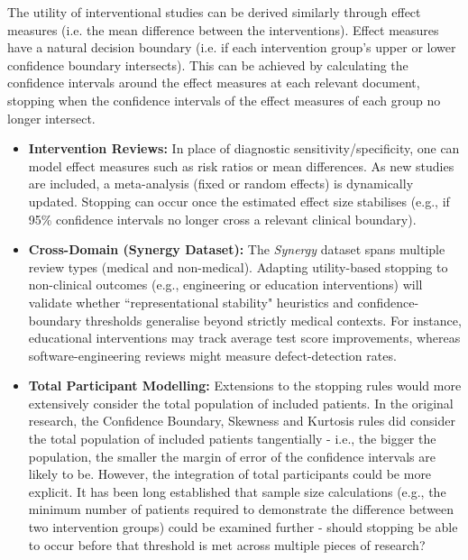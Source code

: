 \documentclass[10pt,oneside]{book}
\begin{document}
The utility of interventional studies can be derived similarly through effect measures (i.e. the mean difference between the interventions). Effect measures have a natural decision boundary (i.e. if each intervention group's upper or lower confidence boundary intersects). This can be achieved by calculating the confidence intervals around the effect measures at each relevant document, stopping when the confidence intervals of the effect measures of each group no longer intersect.

\begin{itemize}
    \item \textbf{Intervention Reviews:} 
    In place of diagnostic sensitivity/specificity, one can model effect measures such as risk ratios or mean differences. As new studies are included, a meta-analysis (fixed or random effects) is dynamically updated. Stopping can occur once the estimated effect size stabilises (e.g., if 95\% confidence intervals no longer cross a relevant clinical boundary).

    \item \textbf{Cross-Domain (Synergy Dataset):}
    The \emph{Synergy} dataset \cite{de_bruin_synergy_2023} spans multiple review types (medical and non-medical). Adapting utility-based stopping to non-clinical outcomes (e.g., engineering or education interventions) will validate whether ``representational stability" heuristics and confidence-boundary thresholds generalise beyond strictly medical contexts. For instance, educational interventions may track average test score improvements, whereas software-engineering reviews might measure defect-detection rates.

    \item \textbf{Total Participant Modelling:}
    Extensions to the stopping rules would more extensively consider the total population of included patients. In the original research, the Confidence Boundary, Skewness and Kurtosis rules did consider the total population of included patients tangentially - i.e., the bigger the population, the smaller the margin of error of the confidence intervals are likely to be. However, the integration of total participants could be more explicit. It has been long established that sample size calculations (e.g., the minimum number of patients required to demonstrate the difference between two intervention groups) could be examined further - should stopping be able to occur before that threshold is met across multiple pieces of research? 
\end{itemize}
\end{document}
